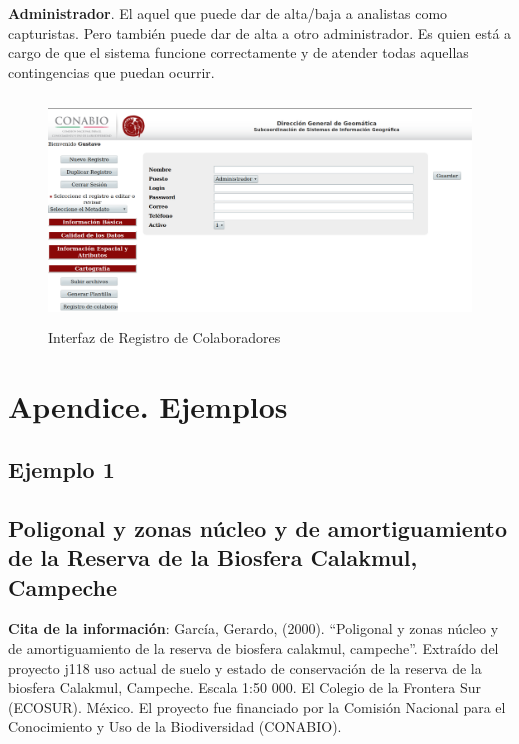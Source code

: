 \documentclass[twoside]{book}
\begin{document}
\textbf{Administrador}. El aquel que puede dar de alta/baja a analistas como capturistas. Pero también puede dar de alta a otro administrador. Es quien está a cargo de que el sistema funcione correctamente y de atender todas aquellas contingencias que puedan ocurrir.

\begin{figure}[h!] %
	\includegraphics[width=12cm, height=6cm]{img/registroColaboradores} %
	\caption{Interfaz de Registro de Colaboradores}
\end{figure}


\chapter*{Apendice. Ejemplos}
\section*{Ejemplo 1}
\section*{Poligonal y zonas núcleo y de amortiguamiento de la Reserva de la Biosfera Calakmul, Campeche}


\textbf{Cita de la información}: García, Gerardo, (2000). “Poligonal y zonas núcleo y de amortiguamiento de la reserva de biosfera calakmul, campeche”. Extraído del proyecto j118 uso actual de suelo y estado de conservación de la reserva de la biosfera Calakmul, Campeche.
Escala 1:50 000. El Colegio de la Frontera Sur (ECOSUR). México. El proyecto fue
financiado por la Comisión Nacional para el Conocimiento y Uso de la Biodiversidad
(CONABIO).
\end{document}
